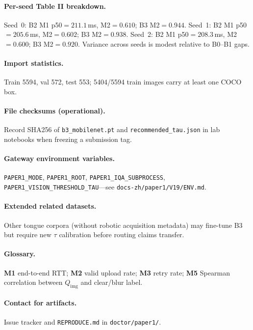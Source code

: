 \begin{table}[h]
\centering
\caption{Latency model components (milliseconds).}
\label{tab:latency-model}
\small
{}
\end{table}

\paragraph{Per-seed Table II breakdown.}
Seed~0: B2 M1 p50$=211.1$\,ms, M2$=0.610$; B3 M2$=0.944$.
Seed~1: B2 M1 p50$=205.6$\,ms, M2$=0.602$; B3 M2$=0.938$.
Seed~2: B2 M1 p50$=208.3$\,ms, M2$=0.600$; B3 M2$=0.920$.
Variance across seeds is modest relative to B0--B1 gaps.

\paragraph{Import statistics.}
Train 5594, val 572, test 553; 5404/5594 train images carry at least one COCO box.

\paragraph{File checksums (operational).}
Record SHA256 of \texttt{b3\_mobilenet.pt} and \texttt{recommended\_tau.json} in lab notebooks when freezing a submission tag.

\paragraph{Gateway environment variables.}
\texttt{PAPER1\_MODE}, \texttt{PAPER1\_ROOT}, \texttt{PAPER1\_IQA\_SUBPROCESS}, \texttt{PAPER1\_VISION\_THRESHOLD\_TAU}---see \texttt{docs-zh/paper1/V19/ENV.md}.

\paragraph{Extended related datasets.}
Other tongue corpora (without robotic acquisition metadata) may fine-tune B3 but require new $\tau$ calibration before routing claims transfer.

\paragraph{Glossary.}
\textbf{M1} end-to-end RTT; \textbf{M2} valid upload rate; \textbf{M3} retry rate; \textbf{M5} Spearman correlation between $Q_{\mathrm{img}}$ and clear/blur label.

\paragraph{Contact for artifacts.}
Issue tracker and \texttt{REPRODUCE.md} in \texttt{doctor/paper1/}.
